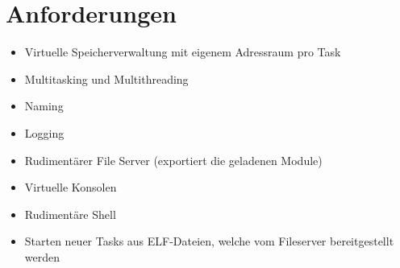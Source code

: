 \section{Anforderungen}

\begin{itemize}
	\item Virtuelle Speicherverwaltung mit eigenem Adressraum pro Task
	\item Multitasking und Multithreading
	\item Naming
	\item Logging
	\item Rudimentärer File Server (exportiert die geladenen Module)
	\item Virtuelle Konsolen
	\item Rudimentäre Shell
	\item Starten neuer Tasks aus ELF-Dateien, welche vom Fileserver bereitgestellt werden
\end{itemize}